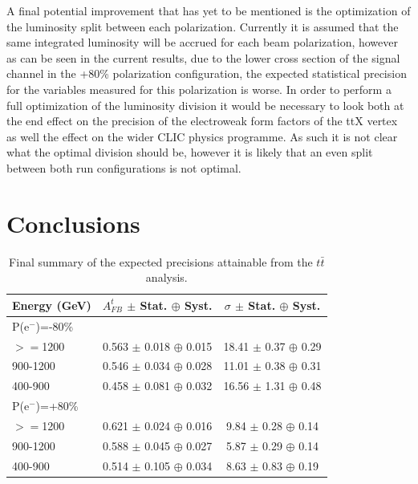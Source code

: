 A final potential improvement that has yet to be mentioned is the optimization of the luminosity split between each polarization. Currently it is assumed that the same integrated luminosity will be accrued for each beam polarization, however as can be seen in the current results, due to the lower cross section of the signal channel in the +80\% polarization configuration, the expected statistical precision for the variables measured for this polarization is worse. In order to perform a full optimization of the luminosity division it would be necessary to look both at the end effect on the precision of the electroweak form factors of the ttX vertex as well the effect on the wider \ac{CLIC} physics programme. As such it is not clear what the optimal division should be, however it is likely that an even split between both run configurations is not optimal.

\section{Conclusions}
\begin{table}[t]
  \centering
  \begin{tabular}{l|c|c}
    \toprule
    Energy (GeV) & $A_{FB}^t$ $\pm$ Stat. $\oplus$ Syst. & $\sigma$  $\pm$ Stat. $\oplus$ Syst.   \\
    \midrule
    \midrule
    \multicolumn{3}{l}{ P(e$^-$)=-80\%}\\
    \midrule
    $>=$1200   & 0.563 $\pm$ 0.018 $\oplus$ 0.015 & 18.41 $\pm$ 0.37 $\oplus$ 0.29\\
    \midrule
    900-1200   & 0.546 $\pm$ 0.034 $\oplus$ 0.028 & 11.01 $\pm$ 0.38 $\oplus$ 0.31\\
    \midrule
    400-900    & 0.458 $\pm$ 0.081 $\oplus$ 0.032 & 16.56 $\pm$ 1.31 $\oplus$ 0.48\\
    \midrule
    \midrule
    \multicolumn{3}{l}{ P(e$^-$)=+80\%}\\
    \midrule
    $>=$1200  & 0.621 $\pm$ 0.024 $\oplus$ 0.016 & 9.84 $\pm$ 0.28 $\oplus$ 0.14\\
    \midrule
    900-1200  & 0.588 $\pm$ 0.045 $\oplus$ 0.027 & 5.87 $\pm$ 0.29 $\oplus$ 0.14\\
    \midrule
    400-900   & 0.514 $\pm$ 0.105 $\oplus$ 0.034 & 8.63 $\pm$ 0.83 $\oplus$ 0.19\\
    \bottomrule
  \end{tabular}
  \caption{Final summary of the expected precisions attainable from the $t\bar{t}$ analysis.}
  \label{tab:conclusionnumbers}
\end{table}

